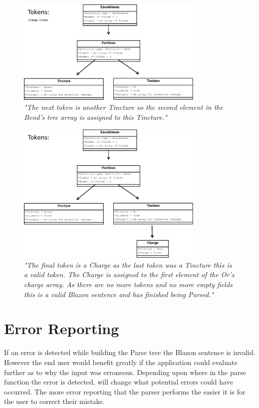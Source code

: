 \begin{figure}[H]
  \centering
    \includegraphics[width=0.8\textwidth]{parsing/images/Parsing2.eps}
  \caption{\emph{"The next token is another Tincture so the second element in the Bend's tree array is assigned to this Tincture."}}
  
\end{figure}

\begin{figure}[H]
  \centering
    \includegraphics[width=0.8\textwidth]{parsing/images/Parsing1.eps}
  \caption{\emph{"The final token is a Charge as the last token was a Tincture this is a valid token.  The Charge is assigned to the first element of the Or's charge array. As there are no more tokens and no more empty fields this is a valid Blazon sentence and has finished being Parsed."}}
  \label{fig:tree}
\end{figure}

\section{Error Reporting}

If an error is detected while building the Parse tree the Blazon sentence is invalid.  However the end user would benefit greatly if the application could evaluate further as to why the input was erroneous.  Depending upon where in the parse function the error is detected, will change what potential errors could have occurred.
The more error reporting that the parser performs the easier it is for the user to correct their mistake. 

